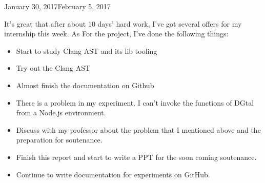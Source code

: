 \begin{fichesuivi}{January 30, 2017}{February 5, 2017}

   \begin{travaileffectue}
       It's great that after about 10 days' hard work, I've got several offers for my internship this week.
    As For the project, I've done the following things:
        \begin{itemize}
            \item Start to study Clang AST and its lib tooling
            \item Try out the Clang AST
            \item Almost finish the documentation on Github
        \end{itemize}
   \end{travaileffectue}

   \begin{travailnoneffectue}
        \begin{itemize}
             \item There is a problem in my experiment. I can't invoke the functions of DGtal from a Node.js environment.
        \end{itemize}
   \end{travailnoneffectue}

 
   \begin{planification}
        \begin{itemize}
            \item Discuss with my professor about the problem that I mentioned above and the preparation for soutenance.
            \item Finish this report and start to write a PPT for the soon coming soutenance.
            \item Continue to write documentation for experiments on GitHub.
        \end{itemize}
   \end{planification}
\end{fichesuivi}




